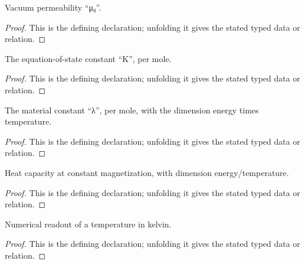 \begin{definition}[VacuumPermeability]
  \label{decl:physics:IPhO_2026_3_B_2:VacuumPermeability}
  Vacuum permeability “μ₀”.
\end{definition}
\begin{proof}
  This is the defining declaration; unfolding it gives the stated typed data or relation.
\end{proof}

\begin{definition}[CurieConstantPerMole]
  \label{decl:physics:IPhO_2026_3_B_2:CurieConstantPerMole}
  The equation-of-state constant “K”, per mole.
\end{definition}
\begin{proof}
  This is the defining declaration; unfolding it gives the stated typed data or relation.
\end{proof}

\begin{definition}[LambdaPerMole]
  \label{decl:physics:IPhO_2026_3_B_2:LambdaPerMole}
  The material constant “λ”, per mole, with the dimension energy times temperature.
\end{definition}
\begin{proof}
  This is the defining declaration; unfolding it gives the stated typed data or relation.
\end{proof}

\begin{definition}[HeatCapacityAtConstantMagnetization]
  \label{decl:physics:IPhO_2026_3_B_2:HeatCapacityAtConstantMagnetization}
  Heat capacity at constant magnetization, with dimension energy/temperature.
\end{definition}
\begin{proof}
  This is the defining declaration; unfolding it gives the stated typed data or relation.
\end{proof}

\begin{definition}[temperatureInKelvin]
  \label{decl:physics:IPhO_2026_3_B_2:temperatureInKelvin}
  Numerical readout of a temperature in kelvin.
\end{definition}
\begin{proof}
  This is the defining declaration; unfolding it gives the stated typed data or relation.
\end{proof}


